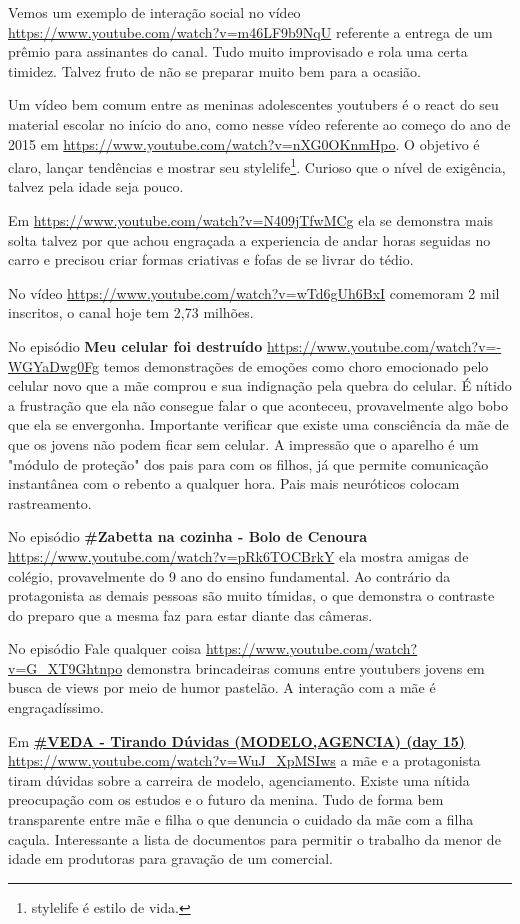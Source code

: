 Vemos um exemplo de interação social no vídeo \url{https://www.youtube.com/watch?v=m46LF9b9NqU} referente a entrega de um prêmio para assinantes do canal. Tudo muito improvisado e rola uma certa timidez. Talvez fruto de não se preparar muito bem para a ocasião.

Um vídeo bem comum entre as meninas adolescentes youtubers é o react do seu material escolar no início do ano, como nesse vídeo referente ao começo do ano de 2015 em \url{https://www.youtube.com/watch?v=nXG0OKnmHpo}. O objetivo é claro, lançar tendências e mostrar seu stylelife\footnote{stylelife é estilo de vida.}. Curioso que o nível de exigência, talvez pela idade seja pouco.

Em \url{https://www.youtube.com/watch?v=N409jTfwMCg} ela se demonstra mais solta talvez por que achou engraçada a experiencia de andar horas seguidas no carro e precisou criar formas criativas e fofas de se livrar do tédio.

No vídeo \url{https://www.youtube.com/watch?v=wTd6gUh6BxI} comemoram 2 mil inscritos, o canal hoje tem 2,73 milhões.

No episódio \textbf{Meu celular foi destruído} \url{https://www.youtube.com/watch?v=-WGYaDwg0Fg} temos demonstrações de emoções como choro emocionado pelo celular novo que a mãe comprou e sua indignação pela quebra do celular. É nítido a frustração que ela não consegue falar o que aconteceu, provavelmente algo bobo que ela se envergonha. Importante verificar que existe uma consciência da mãe de que os jovens não podem ficar sem celular. A impressão que o aparelho é um "módulo de proteção" dos pais para com os filhos, já que permite comunicação instantânea com o rebento a qualquer hora. Pais mais neuróticos colocam rastreamento.

No episódio \textbf{\#Zabetta na cozinha - Bolo de Cenoura} \url{https://www.youtube.com/watch?v=pRk6TOCBrkY} ela mostra amigas de colégio, provavelmente do 9 ano do ensino fundamental. Ao contrário da protagonista as demais pessoas são muito tímidas, o que demonstra o contraste do preparo que a mesma faz para estar diante das câmeras.

No episódio Fale qualquer coisa \url{https://www.youtube.com/watch?v=G_XT9Ghtnpo} demonstra brincadeiras comuns entre youtubers jovens em busca de views por meio de humor pastelão. A interação com a mãe é engraçadíssimo.

Em \href{https://www.youtube.com/watch?v=WuJ_XpMSIws}{\textbf{\#VEDA - Tirando Dúvidas (MODELO,AGENCIA) (day 15)}} \url{https://www.youtube.com/watch?v=WuJ_XpMSIws} a mãe e a protagonista tiram dúvidas sobre a carreira de modelo, agenciamento. Existe uma nítida preocupação com os estudos e o futuro da menina. Tudo de forma bem transparente entre mãe e filha o que denuncia o cuidado da mãe com a filha caçula. Interessante a lista de documentos para permitir o trabalho da menor de idade em produtoras para gravação de um comercial.

